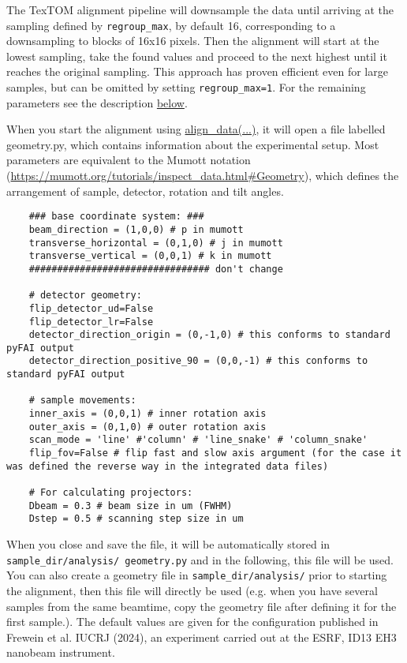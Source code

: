 The TexTOM alignment pipeline will downsample the data until arriving at the 
sampling defined by \texttt{regroup\_max}, by default 16, corresponding to a downsampling to blocks of 16x16 pixels.
Then the alignment will start at the lowest sampling, take the found values and proceed to the next highest until it reaches the
original sampling. This approach has proven efficient even for large samples, but can be omitted by setting \texttt{regroup\_max=1}.
For the remaining parameters see the description \hyperref[fun:aligndata]{below}.

When you start the alignment using \hyperref[fun:aligndata]{align\_data(...)}, it will open a file labelled geometry.py, which contains information about the
experimental setup. Most parameters are equivalent to the Mumott notation (\url{https://mumott.org/tutorials/inspect_data.html#Geometry}),
which defines the arrangement of sample, detector, rotation and tilt angles.

\begin{verbatim}
    ### base coordinate system: ###
    beam_direction = (1,0,0) # p in mumott
    transverse_horizontal = (0,1,0) # j in mumott
    transverse_vertical = (0,0,1) # k in mumott
    ################################ don't change

    # detector geometry: 
    flip_detector_ud=False 
    flip_detector_lr=False
    detector_direction_origin = (0,-1,0) # this conforms to standard pyFAI output
    detector_direction_positive_90 = (0,0,-1) # this conforms to standard pyFAI output

    # sample movements:
    inner_axis = (0,0,1) # inner rotation axis
    outer_axis = (0,1,0) # outer rotation axis
    scan_mode = 'line' #'column' # 'line_snake' # 'column_snake'
    flip_fov=False # flip fast and slow axis argument (for the case it was defined the reverse way in the integrated data files)

    # For calculating projectors:
    Dbeam = 0.3 # beam size in um (FWHM)
    Dstep = 0.5 # scanning step size in um
\end{verbatim}

When you close and save the file, it will be automatically stored in \texttt{sample\_dir/analysis/ geometry.py} and in the following,
this file will be used. You can also create a geometry file in \texttt{sample\_dir/analysis/} prior to starting the alignment,
then this file will directly be used (e.g. when you have several samples from the same beamtime, copy the geometry file after
defining it for the first sample.). The default values are given for the configuration published in Frewein et al. IUCRJ (2024), an experiment
carried out at the ESRF, ID13 EH3 nanobeam instrument.

